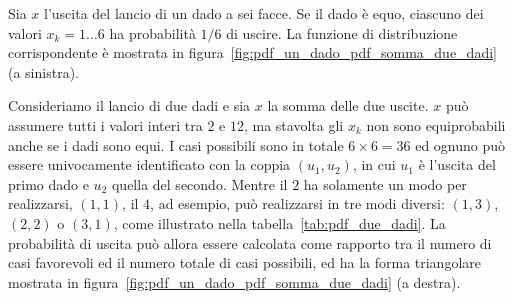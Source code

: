 \begin{examplebox}
  \begin{example}\label{exp:pdf_un_dado}
    Sia $x$ l'uscita del lancio di un dado a sei facce. Se il dado è equo,
    ciascuno dei valori $x_k = 1\ldots6$ ha probabilità $1/6$ di uscire.
    La funzione di distribuzione corrispondente è mostrata in
    figura~\ref{fig:pdf_un_dado_pdf_somma_due_dadi} (a sinistra).
  \end{example}

  \begin{example}\label{exp:pdf_somma_due_dadi}
    Consideriamo il lancio di due dadi e sia $x$ la somma delle due uscite.
    $x$ può assumere tutti i valori interi tra $2$ e $12$, ma stavolta gli
    $x_k$ non sono equiprobabili anche se i dadi sono equi. I casi possibili
    sono in totale $6 \times 6 = 36$ ed ognuno può essere univocamente
    identificato con la coppia $(u_1, u_2)$, in cui $u_1$ è l'uscita del primo
    dado e $u_2$ quella del secondo. Mentre il $2$ ha solamente un modo per
    realizzarsi, $(1, 1)$, il $4$, ad esempio, può realizzarsi in tre modi
    diversi: $(1, 3)$, $(2, 2)$ o $(3, 1)$, come illustrato nella
    tabella~\ref{tab:pdf_due_dadi}. La probabilità di uscita può allora
    essere calcolata come rapporto tra il numero di casi favorevoli ed il
    numero totale di casi possibili, ed ha la forma triangolare mostrata in
    figura~\ref{fig:pdf_un_dado_pdf_somma_due_dadi} (a destra).
  \end{example}
\end{examplebox}


